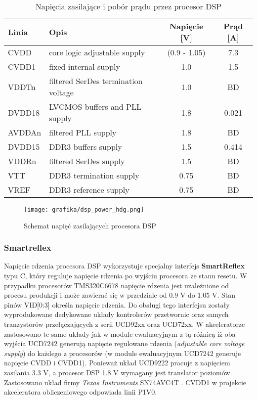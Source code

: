 \begin{table}[h]
\centering
	\caption{Napięcia zasilające i pobór prądu przez procesor DSP}
    \begin{tabular}{p{3cm} p{7cm} c c}
	\toprule
    \textbf{Linia} & \textbf{Opis} & \textbf{Napięcie [V]} & \textbf{Prąd [A]}\\
    \midrule
    CVDD & 		core logic adjustable supply & 			(0.9 - 1.05)	&	7.3\\
    CVDD1 & 		fixed internal supply & 				1.0		&	1.5\\
    VDDTn& 		filtered SerDes termination voltage & 		1.0		&	BD\\
    DVDD18 & 	LVCMOS buffers and PLL supply & 		1.8		&	0.021\\
    AVDDAn & 	filtered PLL supply &				1.8		&	BD\\
    DVDD15& 		DDR3 buffers supply & 				1.5		&	0.414\\
    VDDRn & 		filtered SerDes supply & 				1.5		&	BD\\
    VTT & 		DDR3 termination supply &			0.75		&	BD\\
    VREF & 		DDR3 reference supply &				0.75		&	BD\\
	\toprule
    \end{tabular}

	\label{tbl:dsp_voltages}
\end{table}


\begin{figure}[!ht]
\begin{center}
\texttt{[image: grafika/dsp\_power\_hdg.png]}
\end{center}
\caption{Schemat napięć zasilających procesora DSP}
\label{DSP_POWER}
\end{figure}


\subsubsection{Smartreflex}   
Napięcie rdzenia procesora DSP wykorzystuje specjalny interfejs \textbf{SmartReflex} typu C, który reguluje napięcie rdzenia po wyjściu procesora ze stanu resetu. W przypadku procesorów TMS320C6678 napięcie rdzenia jest uzależnione od procesu produkcji i może zawierać się w przedziale od 0.9 V do 1.05 V. Stan pinów VID[0:3] określa napięcie rdzenia. Do obsługi tego interfejsu zostały wyprodukowane dedykowane układy kontrolerów przetwornic oraz samych tranzystorów przełączających z serii UCD92xx oraz UCD72xx. W akceleratorze zastosowano te same układy jak w module ewaluacyjnym z tą różnicą iż oba wyjścia UCD7242 \cite{UCD7242} generują napięcie regulowane rdzenia (\textit{adjustable core voltage supply}) do każdego z procesorów (w module ewaluacyjnym UCD7242 generuje napięcie CVDD i CVDD1). Ponieważ układ UCD9222 \cite{UCD9222} pracuje z napięciem zasilania 3.3 V, a procesor DSP 1.8 V wymagany jest translator poziomów. Zastosowano układ firmy \textit{Texas Instruments} SN74AVC4T \cite{SN74AVC4T}. CVDD1 w projekcie akceleratora obliczeniowego odpowiada linii P1V0.
